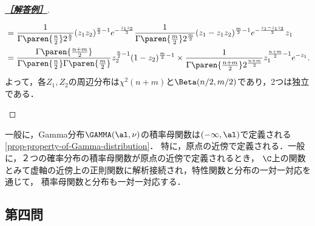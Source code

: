 \documentclass[uplatex,dvipdfmx]{jsarticle}
\begin{document}
\begin{proof}[\textbf{\underline{［解答例］}}]
\begin{enumerate}
\begin{align*}
            &=\frac{1}{\Gamma\paren{\frac{n}{2}}2^{\frac{n}{2}}}(z_1z_2)^{\frac{n}{2}-1}e^{-\frac{z_1z_2}{2}}\frac{1}{\Gamma\paren{\frac{m}{2}}2^{\frac{m}{2}}}(z_1-z_1z_2)^{\frac{m}{2}-1}e^{-\frac{z_1-z_1z_2}{2}}z_1\\
            &=\frac{\Gamma\paren{\frac{n+m}{2}}}{\Gamma\paren{\frac{n}{2}}\Gamma\paren{\frac{m}{2}}}z_2^{\frac{n}{2}-1}(1-z_2)^{\frac{m}{2}-1}\times\frac{1}{\Gamma\paren{\frac{n+m}{2}}2^{\frac{n+m}{2}}}z_1^{\frac{n+m}{2}-1}e^{-z_1}.
        \end{align*}
        よって，各$Z_1,Z_2$の周辺分布は$\chi^2(n+m)$と$\Beta(n/2,m/2)$であり，2つは独立である．
    \end{enumerate}
\end{proof}
\begin{remark*}
    一般に，Gamma分布$\GAMMA(\al,\nu)$の積率母関数は$(-\infty,\al)$で定義される\ref{prop-property-of-Gamma-distribution}．
    特に，原点の近傍で定義される．一般に，２つの確率分布の積率母関数が原点の近傍で定義されるとき，
    $\C$上の関数とみて虚軸の近傍上の正則関数に解析接続され，特性関数と分布の一対一対応を通じて，
    積率母関数と分布も一対一対応する．
\end{remark*}

\subsection{第四問}
\end{document}
